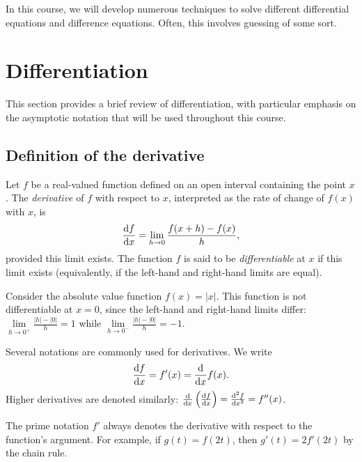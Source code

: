 \documentclass[a4paper]{article}
\begin{document}
In this course, we will develop numerous techniques to solve different differential equations and difference equations. Often, this involves guessing of some sort.

\section{Differentiation}
This section provides a brief review of differentiation, with particular emphasis on the asymptotic notation that will be used throughout this course.

\subsection{Definition of the derivative}
\begin{defi}
  Let $f$ be a real-valued function defined on an open interval containing the point $x$. The \emph{derivative} of $f$ with respect to $x$, interpreted as the rate of change of $f(x)$ with $x$, is
  \[
    \frac{\mathrm{d} f}{\mathrm{d} x} = \lim_{h\to 0} \frac{f(x + h) - f(x)}{h},
  \]
  provided this limit exists. The function $f$ is said to be \emph{differentiable} at $x$ if this limit exists (equivalently, if the left-hand and right-hand limits are equal).
\end{defi}

\begin{eg}
  Consider the absolute value function $f(x)=|x|$. This function is not differentiable at $x = 0$, since the left-hand and right-hand limits differ: $\lim\limits_{h\to 0^+} \frac{|h| - |0|}{h}= 1$ while $\lim\limits_{h\to 0^-} \frac{|h| - |0|}{h}= -1$.
\end{eg}

\begin{notation}
  Several notations are commonly used for derivatives. We write
  \[
    \frac{\mathrm{d} f}{\mathrm{d} x} = f'(x) = \frac{\mathrm{d}}{\mathrm{d} x} f(x).
  \]
  Higher derivatives are denoted similarly: $\frac{\mathrm{d}}{\mathrm{d} x}\left(\frac{\mathrm{d} f}{\mathrm{d} x}\right) = \frac{\mathrm{d}^2 f}{\mathrm{d} x^2} = f''(x)$.

  The prime notation $f'$ always denotes the derivative with respect to the function's argument. For example, if $g(t) = f(2t)$, then $g'(t) = 2f'(2t)$ by the chain rule.
\end{notation}
\end{document}
